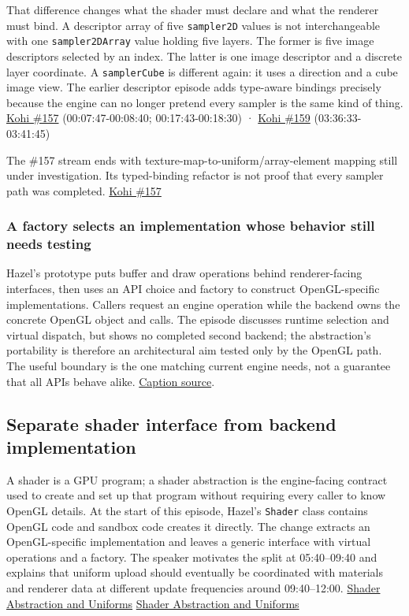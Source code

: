 That difference changes what the shader must declare and what the renderer must bind. A descriptor array of five \texttt{sampler2D} values is not interchangeable with one \texttt{sampler2DArray} value holding five layers. The former is five image descriptors selected by an index. The latter is one image descriptor and a discrete layer coordinate. A \texttt{samplerCube} is different again: it uses a direction and a cube image view. The earlier descriptor episode adds type-aware bindings precisely because the engine can no longer pretend every sampler is the same kind of thing. \href{https://www.youtube.com/watch?v=ZmZUmsqUN6Q}{Kohi \#157} (00:07:47-00:08:40; 00:17:43-00:18:30) · \href{https://www.youtube.com/watch?v=FrtHF-9K1HI}{Kohi \#159} (03:36:33-03:41:45)

The \#157 stream ends with texture-map-to-uniform/array-element mapping still under investigation. Its typed-binding refactor is not proof that every sampler path was completed. \href{https://www.youtube.com/watch?v=ZmZUmsqUN6Q}{Kohi \#157}

\subsubsection{A factory selects an implementation whose behavior still needs testing}\label{06-engine-ii-ch025-a-factory-selects-an-implementation-whose-behavior-still-needs-testing}

Hazel's prototype puts buffer and draw operations behind renderer-facing interfaces, then uses an API choice and factory to construct OpenGL-specific implementations. Callers request an engine operation while the backend owns the concrete OpenGL object and calls. The episode discusses runtime selection and virtual dispatch, but shows no completed second backend; the abstraction's portability is therefore an architectural aim tested only by the OpenGL path. The useful boundary is the one matching current engine needs, not a guarantee that all APIs behave alike. \href{https://www.youtube.com/watch?v=BwCqRqqbB1Y}{Caption source}.

\subsection{Separate shader interface from backend implementation}\label{06-engine-ii-ch025-separate-shader-interface-from-backend-implementation}

A shader is a GPU program; a shader abstraction is the engine-facing contract used to create and set up that program without requiring every caller to know OpenGL details. At the start of this episode, Hazel's \texttt{Shader} class contains OpenGL code and sandbox code creates it directly. The change extracts an OpenGL-specific implementation and leaves a generic interface with virtual operations and a factory. The speaker motivates the split at 05:40--09:40 and explains that uniform upload should eventually be coordinated with materials and renderer data at different update frequencies around 09:40--12:00. \href{https://www.youtube.com/watch?v=d5wL6eZnWMU&t=340s}{Shader Abstraction and Uniforms} \href{https://www.youtube.com/watch?v=d5wL6eZnWMU&t=580s}{Shader Abstraction and Uniforms}

